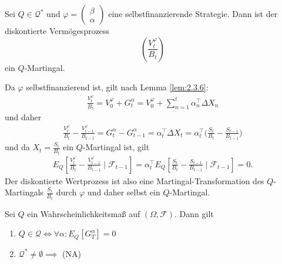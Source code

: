 \documentclass[a4paper,twoside,DIV15,BCOR12mm]{scrbook}
\newcommand{\cF}{\mathcal F}
\newcommand{\cQ}{\mathcal Q}
\begin{document}
\begin{satz}
Sei $Q\in \cQ^*$ und \label{satz:2.5.1}
$\varphi=\left(\begin{smallmatrix} \beta \\ \alpha \end{smallmatrix}\right)$ 
eine selbstfinanzierende Strategie. Dann ist der diskontierte Ver\-mög\-es\-pro\-zess
\[
\left(\frac{V_t^\varphi}{B_t}\right)
\]
ein $Q$-Martingal.
\end{satz}
\begin{beweis}
Da $\varphi$ selbstfinanzierend ist, gilt nach Lemma \ref{lem:2.3.6}:
\begin{align*}
\frac{V_t^\varphi}{B_t} = V_0^\varphi + G_t^\alpha = V_0^\varphi + \sum_{n=1}^t \alpha_n^\top \Delta X_n
\end{align*}
und daher
\begin{align*}
\frac{V_t^\varphi}{B_t} - \frac{V_{t-1}^\varphi}{B_{t-1}}
= G_t^\alpha - G_{t-1}^\alpha = \alpha_t^\top \Delta X_t = \alpha_t^\top \bigg(\frac{S_t}{B_t} - \frac{S_{t-1}}{B_{t-1}}\bigg)
\end{align*}
und da $X_t = \frac{S_t}{B_t}$ ein $Q$-Martingal ist, gilt 
\begin{align*}
E_Q[\frac{V_t^\varphi}{B_t} - \frac{V_{t-1}^\varphi}{B_{t-1}}\mid \cF_{t-1}]
= \alpha^\top_t E_Q[\frac{S_t}{B_t} - \frac{S_{t-1}}{B_{t-1}}\mid \cF_{t-1}] = 0.
\end{align*}
Der diskontierte Wertprozess ist also eine Martingal-Transformation des $Q$-Martingals $\frac{S_t}{B_t}$ durch $\varphi$ und daher selbst ein $Q$-Martingal.
\end{beweis}

\begin{satz}
Sei $Q$ ein Wahrscheinlichkeitsmaß auf $(\Omega,\cF)$. Dann gilt\label{satz:2.5.2}
\begin{enumerate}
\item $Q\in \cQ\iff \forall \alpha: E_Q[G^\alpha_T]=0$
\item $\cQ^*\ne \emptyset \implies$ (NA)
\end{enumerate}
\end{satz}
\end{document}

